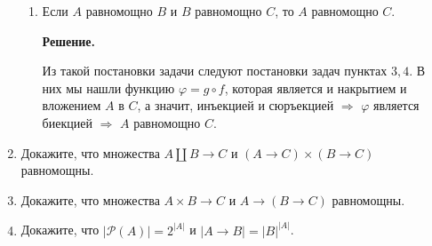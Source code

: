 \documentclass[draft]{article}
\begin{document}
\begin{enumerate}
\begin{enumerate}
\item Если $A$ равномощно $B$ и $B$ равномощно $C$, то $A$ равномощно $C$.

\textbf{Решение.} 

Из такой постановки задачи следуют постановки задач пунктах $3, 4$. В них мы нашли функцию 
$\varphi = g \circ f$, которая является и накрытием и вложением $A$ в $C$, а значит, инъекцией 
и сюръекцией $\Rightarrow$ $\varphi$ является биекцией $\Rightarrow$ $A$ равномощно $C$.

\end{enumerate}

\item Докажите, что множества $A \amalg B \to C$ и $(A \to C) \times (B \to C)$ равномощны.

\item Докажите, что множества $A \times B \to C$ и $A \to (B \to C)$ равномощны.

\item Докажите, что $|\mathcal{P}(A)| = 2^{|A|}$ и $|A \to B| = |B|^{|A|}$.

\end{enumerate}
\end{document}
